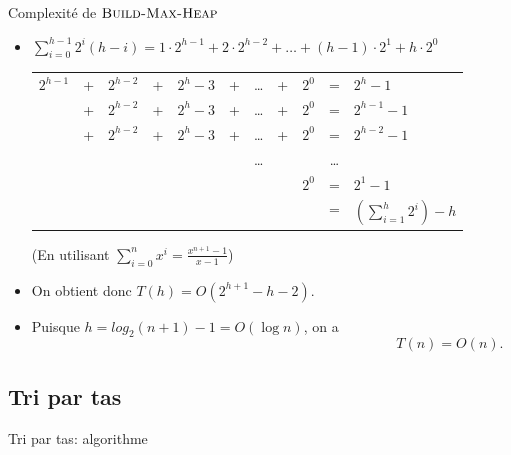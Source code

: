 \begin{frame}{Complexité de $\textnormal{\scshape Build-Max-Heap}$}
\begin{itemize}
\item $\sum_{i=0}^{h-1} 2^i (h-i)=1\cdot 2^{h-1}+2\cdot 2^{h-2}+\ldots+(h-1)\cdot 2^1+h\cdot 2^0$

\bigskip

\begin{small}
\begin{tabular}{ccccccccccl}
$2^{h-1}$ & + & $2^{h-2}$ & + & $2^h-3$ & + & \ldots & +& $2^0$ & = & $2^{h}-1$\\
 & + & $2^{h-2}$ & + & $2^h-3$ & + & \ldots & +& $2^0$ & = & $2^{h-1}-1$\\
 & + & $2^{h-2}$ & + & $2^h-3$ & + & \ldots & +& $2^0$ & = & $2^{h-2}-1$\\
 &   &        &   &      &   & \ldots &  &    & \ldots & \\
 &   &        &   &     &    &        & & $2^0$ & = & $2^1-1$\\
\hline
 &   &        &   &     &    &        & &     & = & $\left(\sum_{i=1}^h 2^i\right)-h$
\end{tabular}
\end{small}

\medskip

(En utilisant $\sum_{i=0}^n x^i=\frac{x^{n+1}-1}{x-1}$)

\bigskip

\item On obtient donc $T(h)=O(2^{h+1}-h-2).$
\item Puisque $h=log_2(n+1)-1=O(\log n)$, on a $$T(n)=O(n).$$
\end{itemize}
\end{frame}


\subsection{Tri par tas}

\begin{frame}{Tri par tas: algorithme}

\begin{center}
\end{center}

\end{frame}

